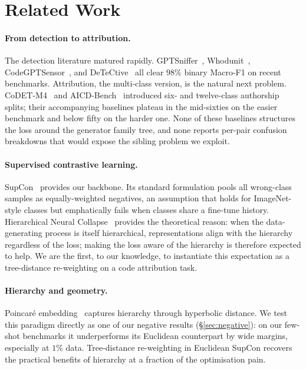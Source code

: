 ﻿\documentclass[11pt]{article}
\begin{document}
\section{Related Work}
\label{sec:related}

\paragraph{From detection to attribution.} The detection literature
matured rapidly. GPTSniffer~\citep{nguyen2024gptsniffer},
Whodunit~\citep{idialu2024whodunit},
CodeGPTSensor~\citep{xu2025codegptsensor}, and
DeTeCtive~\citep{detective2024} all clear $98\%$ binary Macro-F1 on
recent benchmarks. Attribution, the multi-class version, is the
natural next problem. CoDET-M4~\citep{orel2025codetm4} and
AICD-Bench~\citep{orel2026aicd} introduced six- and twelve-class
authorship splits; their accompanying baselines plateau in the
mid-sixties on the easier benchmark and below fifty on the harder
one. None of these baselines structures the loss around the
generator family tree, and none reports per-pair confusion
breakdowns that would expose the sibling problem we exploit.

\paragraph{Supervised contrastive learning.}
SupCon~\citep{khosla2020supcon} provides our backbone. Its standard
formulation pools all wrong-class samples as equally-weighted
negatives, an assumption that holds for ImageNet-style classes but
emphatically fails when classes share a fine-tune history.
Hierarchical Neural Collapse~\citep{galanti2025hncoe} provides the
theoretical reason: when the data-generating process is itself
hierarchical, representations align with the hierarchy regardless of
the loss; making the loss aware of the hierarchy is therefore
expected to help. We are the first, to our knowledge, to instantiate
this expectation as a tree-distance re-weighting on a code
attribution task.

\paragraph{Hierarchy and geometry.}
Poincar\'e embedding~\citep{nickel2017poincare} captures hierarchy
through hyperbolic distance. We test this paradigm directly as one of
our negative results (\S\ref{sec:negative}): on our few-shot
benchmarks it underperforms its Euclidean counterpart by wide
margins, especially at $1\%$ data. Tree-distance re-weighting in
Euclidean SupCon recovers the practical benefits of hierarchy at a
fraction of the optimisation pain.
\end{document}
